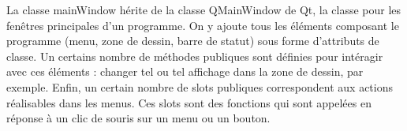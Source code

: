 La classe mainWindow h\'erite de la classe QMainWindow de Qt, la classe pour les fen\^etres principales d'un programme. On y ajoute tous les \'el\'ements composant le programme (menu, zone de dessin, barre de statut) sous forme d'attributs de classe.
Un certains nombre de m\'ethodes publiques sont d\'efinies pour int\'eragir avec ces \'el\'ements : changer tel ou tel affichage dans la zone de dessin, par exemple.
Enfin, un certain nombre de slots publiques correspondent aux actions r\'ealisables dans les menus. Ces slots sont des fonctions qui sont appel\'ees en r\'eponse \`a un clic de souris sur un menu ou un bouton.